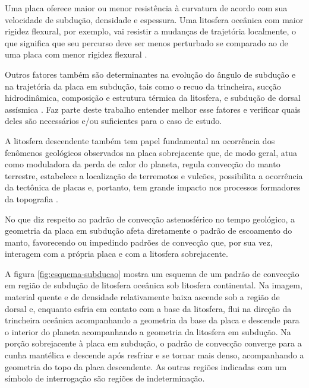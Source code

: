 
Uma placa oferece maior ou menor resistência à curvatura de acordo com sua velocidade de subdução, densidade e espessura. Uma litosfera oceânica com maior rigidez flexural, por exemplo, vai resistir a mudanças de trajetória localmente, o que significa que seu percurso deve ser menos perturbado se comparado ao de uma placa com menor rigidez flexural \citep{assuncao2019}.

Outros fatores também são determinantes na evolução do ângulo de subdução e na trajetória da placa em subdução, tais como o recuo da trincheira, sucção hidrodinâmica, composição e estrutura térmica da litosfera, e subdução de dorsal assísmica \citep{schellart2007evolution,bishop2017,antonijevic2015}. Faz parte deste trabalho entender melhor esse fatores e verificar quais deles são necessários e/ou suficientes para o caso de estudo.

A litosfera descendente também tem papel fundamental na ocorrência dos fenômenos geológicos observados na placa sobrejacente que, de modo geral, atua como moduladora da perda de calor do planeta, regula convecção do manto terrestre, estabelece a localização de terremotos e vulcões, possibilita a ocorrência da tectônica de placas e, portanto, tem grande impacto nos processos formadores da topografia \citep{zhong2015treatise,mooney2015treatise}. 

No que diz respeito ao padrão de convecção astenosférico no tempo geológico, a geometria da placa em subdução afeta diretamente o padrão de escoamento do manto, favorecendo ou impedindo padrões de convecção que, por sua vez, interagem com a própria placa e com a litosfera sobrejacente.

A figura \ref{fig:esquema-subducao} mostra um esquema de um padrão de convecção em região de subdução de litosfera oceânica sob litosfera continental. Na imagem, material quente e de densidade relativamente baixa ascende sob a região de dorsal e, enquanto esfria em contato com a base da litosfera, flui na direção da trincheira oceânica acompanhando a geometria da base da placa e descende para o interior do planeta acompanhando a geometria da litosfera em subdução. Na porção sobrejacente à placa em subdução, o padrão de convecção converge para a cunha mantélica e descende após resfriar e se tornar mais denso, acompanhando a geometria do topo da placa descendente. As outras regiões indicadas com um símbolo de interrogação são regiões de indeterminação.
    
